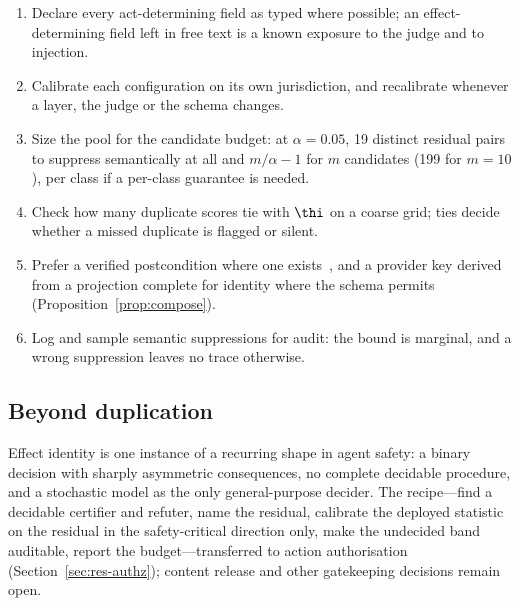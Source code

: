 \begin{enumerate}[(1),leftmargin=*,itemsep=1pt]
\item Declare every act-determining field as typed where possible; an effect-determining field left in free text is a known exposure to the judge and to injection.
\item Calibrate each configuration on its own jurisdiction, and recalibrate whenever a layer, the judge or the schema changes.
\item Size the pool for the candidate budget: at $\alpha=0.05$, 19 distinct residual pairs to suppress semantically at all and $m/\alpha-1$ for $m$ candidates (199 for $m=10$), per class if a per-class guarantee is needed.
\item Check how many duplicate scores tie with $\thi$ on a coarse grid; ties decide whether a missed duplicate is flagged or silent.
\item Prefer a verified postcondition where one exists~\cite{mansoor2026verified}, and a provider key derived from a projection complete for identity where the schema permits (Proposition~\ref{prop:compose}).
\item Log and sample semantic suppressions for audit: the bound is marginal, and a wrong suppression leaves no trace otherwise.
\end{enumerate}

\subsection{Beyond duplication}

Effect identity is one instance of a recurring shape in agent safety: a binary decision with sharply asymmetric consequences, no complete decidable procedure, and a stochastic model as the only general-purpose decider. The recipe---find a decidable certifier and refuter, name the residual, calibrate the deployed statistic on the residual in the safety-critical direction only, make the undecided band auditable, report the budget---transferred to action authorisation (Section~\ref{sec:res-authz}); content release and other gatekeeping decisions remain open.
